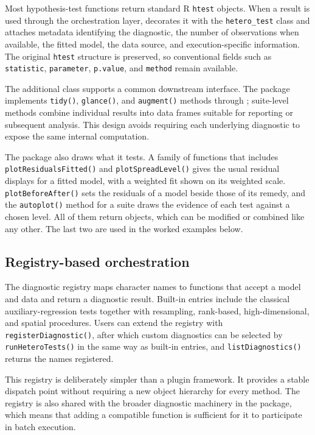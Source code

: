 Most hypothesis-test functions return standard R \texttt{htest} objects. When a
result is used through the orchestration layer,  decorates it
with the \texttt{hetero\_test} class and attaches metadata identifying the diagnostic,
the number of observations when available, the fitted model, the data source,
and execution-specific information. The original \texttt{htest} structure is
preserved, so conventional fields such as \texttt{statistic}, \texttt{parameter},
\texttt{p.value}, and \texttt{method} remain available.

The additional class supports a common downstream interface. The package
implements \texttt{tidy()}, \texttt{glance()}, and \texttt{augment()} methods through
; suite-level methods combine individual results into data
frames suitable for reporting or subsequent analysis. This design avoids
requiring each underlying diagnostic to expose the same internal computation.

The package also draws what it tests. A family of functions that includes
\texttt{plotResidualsFitted()} and \texttt{plotSpreadLevel()} gives the usual residual
displays for a fitted model, with a weighted fit shown on its weighted scale.
\texttt{plotBeforeAfter()} sets the residuals of a model beside those of its
remedy, and the \texttt{autoplot()} method for a suite draws the evidence of each test
against a chosen level. All of them return  objects, which can
be modified or combined like any other. The last two are used in the worked
examples below.

\subsection{Registry-based orchestration}\label{registry-based-orchestration}

The diagnostic registry maps character names to functions that accept a model
and data and return a diagnostic result. Built-in entries include the classical
auxiliary-regression tests together with resampling, rank-based,
high-dimensional, and spatial procedures. Users can extend the registry with
\texttt{registerDiagnostic()}, after which custom diagnostics can be selected by
\texttt{runHeteroTests()} in the same way as built-in entries, and
\texttt{listDiagnostics()} returns the names registered.

This registry is deliberately simpler than a plugin framework. It provides a
stable dispatch point without requiring a new object hierarchy for every
method. The registry is also shared with the broader diagnostic machinery in
the package, which means that adding a compatible function is sufficient for it
to participate in batch execution.

